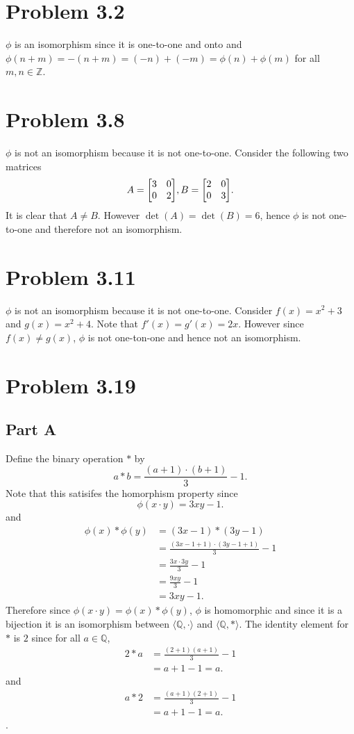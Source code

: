 \documentclass[12pt]{extarticle}
\begin{document}
\section*{Problem 3.2}
$\phi$ is an isomorphism since it is one-to-one and onto and $\phi(n+m) = - (n + m) = (-n) + (-m) = \phi(n) + \phi(m)$ for all $m,n \in \mathbb{Z}$.

\section*{Problem 3.8}
$\phi$ is not an isomorphism because it is not one-to-one. Consider the following two matrices
\[
	A = \mqty[3 & 0 \\ 0 & 2], B = \mqty[2 & 0 \\ 0 & 3]
.\]
It is clear that $A \neq B$. However $\det(A) = \det(B) = 6$, hence $\phi$ is not one-to-one and therefore not an isomorphism.

\section*{Problem 3.11}
$\phi$ is not an isomorphism because it is not one-to-one. Consider $f(x) = x^2 + 3$ and $g(x) = x^2 + 4$. Note that $f'(x) = g'(x) = 2x$. However since $f(x) \neq g(x)$, $\phi$ is not one-ton-one and hence not an isomorphism.

\section*{Problem 3.19}
\subsection*{Part A}
Define the binary operation $*$ by
\[
	a * b = \frac{(a+1)\cdot (b+1)}{3} - 1
.\]
Note that this satisifes the homorphism property since
\[
	\phi(x \cdot y) = 3xy - 1
.\]
and
\begin{align*}
	\phi(x) * \phi(y) &= (3x - 1) * (3y - 1) \\
										&= \frac{(3x - 1 + 1)\cdot (3y - 1 + 1)}{3} - 1 \\
										&= \frac{3x\cdot 3y}{3} - 1 \\
										&= \frac{9xy}{3} - 1 \\
										&= 3xy - 1
.\end{align*}
Therefore since $\phi(x \cdot y) = \phi(x) * \phi(y)$, $\phi$ is homomorphic and since it is a bijection it is an isomorphism between $\langle \mathbb{Q}, \cdot \rangle$ and $\langle \mathbb{Q}, * \rangle$. The identity element for $*$ is $2$ since for all $a \in \mathbb{Q}$,
\begin{align*}
	2 * a &= \frac{(2+1)(a+1)}{3} - 1 \\
				&= a + 1 - 1 = a
.\end{align*}
and
\begin{align*}
	a * 2 &= \frac{(a + 1)(2 + 1)}{3} - 1 \\
	&= a + 1 - 1 = a
.\end{align*}.
\end{document}
